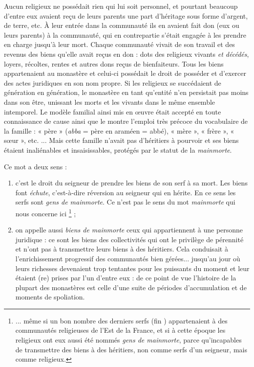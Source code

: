  Aucun religieux ne possédait rien qui lui soit personnel, et pourtant beaucoup d'entre eux avaient reçu de leurs parents une part d'héritage sous forme d'argent, de terre, etc. À leur entrée dans la communauté ils en avaient fait don (eux ou leurs parents) à la communauté, qui en contrepartie s'était engagée à les prendre en charge jusqu'à leur mort. Chaque communauté vivait de son travail et des revenus des biens qu'elle avait reçus en don : dots des religieux vivants \emph{et décédés}, loyers, récoltes, rentes et autres dons reçus de bienfaiteurs. Tous les biens appartenaient au monastère et celui-ci possédait le droit de posséder et d'exercer des actes juridiques en son nom propre. Si les religieux se succédaient de génération en génération, le monastère en tant qu'entité n'en persistait pas moins dans son être, unissant les morts et les vivants dans le même ensemble intemporel. Le modèle familial ainsi mis en œuvre était accepté en toute connaissance de cause ainsi que le montre l'emploi très précoce du vocabulaire de la famille : « père » (\emph{abba} = père en araméen = abbé), « mère », « frère », « sœur », etc.  ... Mais cette famille n'avait pas d'héritiers à pourvoir et ses biens étaient inaliénables et insaisissables, protégés par le statut de la \emph{mainmorte}. 
 
 Ce mot a deux sens :
\begin{enumerate}
\item c'est le droit du seigneur de prendre les biens de son serf à sa mort. Les biens font \emph{échute}, c'est-à-dire réversion au seigneur qui en hérite. En ce sens les serfs sont \emph{gens de mainmorte}. Ce n'est pas le sens du mot \emph{mainmorte} qui nous concerne ici%
\footnote{... même si un bon nombre des derniers serfs (fin ) appartenaient à des communautés religieuses de l'Est de la France, et si à cette époque les religieux ont eux aussi été nommés \emph{gens de mainmorte}, parce qu'incapables de transmettre des biens à des héritiers, non comme serfs d'un seigneur, mais comme religieux.}
 ;
\item on appelle aussi \emph{biens de mainmorte} ceux qui appartiennent à une personne juridique : ce sont les biens des collectivités qui ont le privilège de pérennité et n'ont pas à transmettre leurs biens à des héritiers. Cela conduisait à l'enrichissement progressif des communautés bien gérées... jusqu'au jour où leurs richesses devenaient trop tentantes pour les puissants du moment et leur étaient (re) prises par l'un d'entre eux : de ce point de vue l'histoire de la plupart des monastères est celle d'une suite de périodes d'accumulation et de moments de spoliation.
\end{enumerate} 

